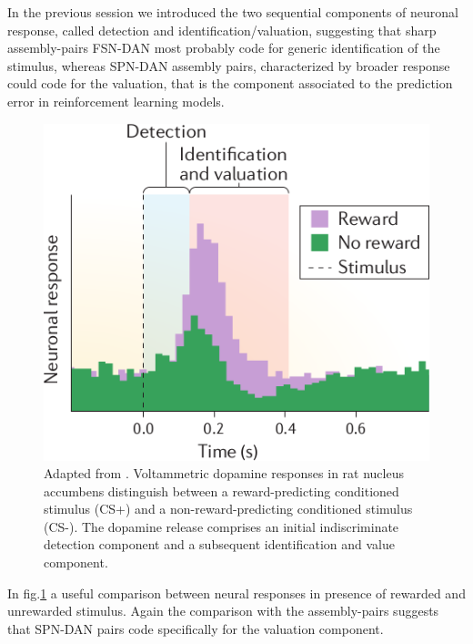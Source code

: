 In the previous session we introduced the two sequential components of neuronal response, called detection and identification/valuation, suggesting that sharp assembly-pairs FSN-DAN most probably code for generic identification of the stimulus, whereas SPN-DAN assembly pairs, characterized by broader response could code for the valuation, that is the component associated to the prediction error in reinforcement learning models.\\
\begin{figure}
    \centering
    \includegraphics[scale=0.4]{figures/Schultz2016CSMod.png}
    \caption{Adapted from \cite{Schultz2016}. Voltammetric dopamine responses in rat nucleus accumbens distinguish between a reward-predicting conditioned stimulus (CS+) and a non-reward-predicting conditioned stimulus (CS-). The dopamine release comprises an initial indiscriminate detection component and a subsequent identification and value component.}
    \label{fig:dopCS}
\end{figure}
In fig.\ref{fig:dopCS} a useful comparison between neural responses in presence of rewarded and unrewarded stimulus. Again the comparison with the assembly-pairs suggests that SPN-DAN pairs code specifically for the valuation component.
